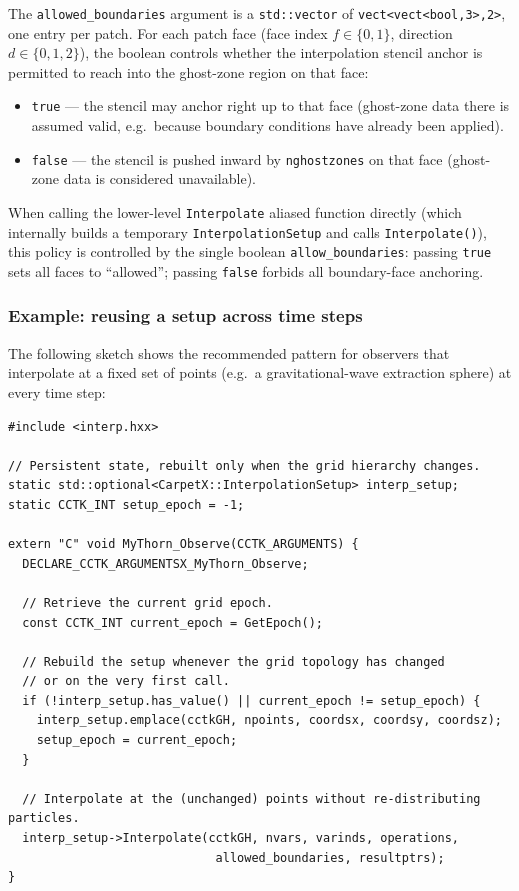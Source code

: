 The \texttt{allowed\_boundaries} argument is a \texttt{std::vector} of \texttt{vect<vect<bool,3>,2>}, one entry per patch. For each patch face (face index $f \in \{0,1\}$, direction $d \in \{0,1,2\}$), the boolean controls whether the interpolation stencil anchor is permitted to reach into the ghost-zone region on that face:
%
\begin{itemize}
  \item \texttt{true} --- the stencil may anchor right up to that face (ghost-zone data there is assumed valid, e.g.\ because boundary conditions have already been applied).
  \item \texttt{false} --- the stencil is pushed inward by \texttt{nghostzones} on that face (ghost-zone data is considered unavailable).
\end{itemize}
%
When calling the lower-level \texttt{Interpolate} aliased function directly (which internally builds a temporary \texttt{InterpolationSetup} and calls \texttt{Interpolate()}), this policy is controlled by the single boolean \texttt{allow\_boundaries}: passing \texttt{true} sets all faces to ``allowed''; passing \texttt{false} forbids all boundary-face anchoring.

\subsubsection{Example: reusing a setup across time steps}

The following sketch shows the recommended pattern for observers that interpolate at a fixed set of points (e.g.\ a gravitational-wave extraction sphere) at every time step:

\begin{lstlisting}
#include <interp.hxx>

// Persistent state, rebuilt only when the grid hierarchy changes.
static std::optional<CarpetX::InterpolationSetup> interp_setup;
static CCTK_INT setup_epoch = -1;

extern "C" void MyThorn_Observe(CCTK_ARGUMENTS) {
  DECLARE_CCTK_ARGUMENTSX_MyThorn_Observe;

  // Retrieve the current grid epoch.
  const CCTK_INT current_epoch = GetEpoch();

  // Rebuild the setup whenever the grid topology has changed
  // or on the very first call.
  if (!interp_setup.has_value() || current_epoch != setup_epoch) {
    interp_setup.emplace(cctkGH, npoints, coordsx, coordsy, coordsz);
    setup_epoch = current_epoch;
  }

  // Interpolate at the (unchanged) points without re-distributing particles.
  interp_setup->Interpolate(cctkGH, nvars, varinds, operations,
                             allowed_boundaries, resultptrs);
}
\end{lstlisting}

